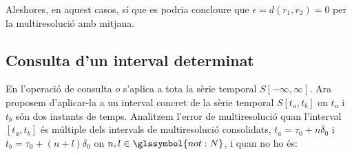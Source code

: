  Aleshores, en aquest casos, sí que es podria concloure que
  $\epsilon=d(r_1,r_2)=0$ per la multiresolució amb mitjana.



\subsection{Consulta d'un interval determinat}
\label{ex:multireoslucio:informacio-subresolucions}







En  l'operació de consulta $o$
s'aplica a tota la sèrie temporal $S[-\infty,\infty]$. Ara proposem
d'aplicar-la a un interval concret de la sèrie temporal $S[t_a,t_b]$
on $t_a$ i $t_b$ són dos instants de temps.  Analitzem l'error de
multiresolució quan l'interval $[t_a,t_b]$ és múltiple dels intervals
de multiresolució consolidats, $t_a=\tau_0+n\delta_0$ i
$t_b=\tau_0+(n+l)\delta_0$ on $n,l\in\glssymbol{not:N}$, i quan no ho
és:

